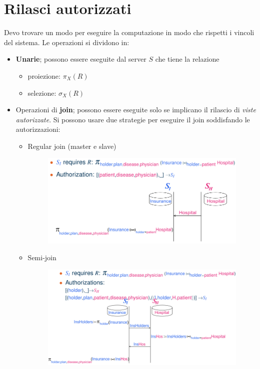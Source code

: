 \documentclass{report}
\begin{document}
\section{Rilasci autorizzati}
Devo trovare un modo per eseguire la computazione in modo che rispetti i vincoli del sistema.
Le operazioni si dividono in:
\begin{itemize}
    \item \textbf{Unarie}; possono essere eseguite dal server $S$ che tiene la relazione
    \begin{itemize}
        \item proiezione: $\pi_X(R)$
        \item selezione: $\sigma_X(R)$
    \end{itemize}
    \item Operazioni di \textbf{join}; possono essere eseguite solo se implicano il rilascio 
    di \textit{viste autorizzate}. Si possono usare due strategie per eseguire il join soddisfando le autorizzazioni:
    \begin{itemize}
        \item Regular join (master e slave) 
        \begin{figure}[H]
            \centering
            \includegraphics[width=1\linewidth]{images/regular-join.png}
        \end{figure}

        \item Semi-join
        \begin{figure}[H]
            \centering
            \includegraphics[width=1\linewidth]{images/semi-join.png}
        \end{figure}
    \end{itemize}
 \end{itemize}
\end{document}
